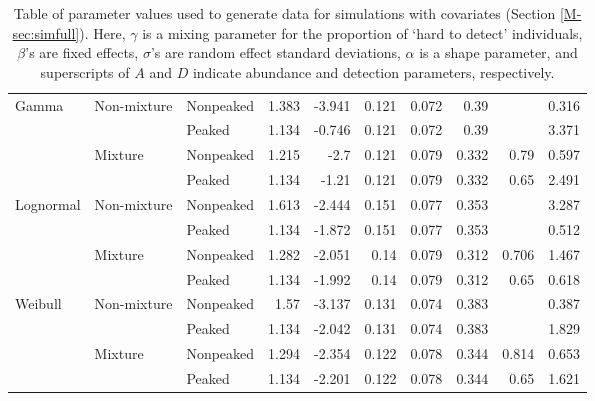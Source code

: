 \documentclass[useAMS,usenatbib,referee,12pt]{article}
\begin{document}
\begin{table}
\begin{tabular}{ll|lrrrrrrr}
Gamma & Non-mixture & Nonpeaked &1.383&-3.941&0.121&0.072&0.39& & 0.316 \\
& & Peaked &1.134&-0.746&0.121&0.072&0.39& & 3.371 \\
& Mixture & Nonpeaked &1.215&-2.7&0.121&0.079&0.332&0.79& 0.597 \\
& & Peaked &1.134&-1.21&0.121&0.079&0.332&0.65& 2.491 \\
Lognormal & Non-mixture & Nonpeaked &1.613&-2.444&0.151&0.077&0.353& & 3.287 \\
& & Peaked &1.134&-1.872&0.151&0.077&0.353& & 0.512 \\
& Mixture & Nonpeaked &1.282&-2.051&0.14&0.079&0.312&0.706& 1.467 \\
& & Peaked &1.134&-1.992&0.14&0.079&0.312&0.65& 0.618 \\
Weibull & Non-mixture & Nonpeaked &1.57&-3.137&0.131&0.074&0.383& & 0.387 \\
& & Peaked &1.134&-2.042&0.131&0.074&0.383& & 1.829 \\
& Mixture & Nonpeaked &1.294&-2.354&0.122&0.078&0.344&0.814& 0.653 \\
& & Peaked &1.134&-2.201&0.122&0.078&0.344&0.65& 1.621 \\
   \hline
\end{tabular}
\caption{\label{tbl:sim3}Table of parameter values used to generate data for simulations with covariates (Section \ref{M-sec:simfull}).  Here, $\gamma$ is a mixing parameter for the proportion of `hard to detect' individuals, $\beta$'s are fixed effects, $\sigma$'s are random effect standard deviations, $\alpha$ is a shape parameter, and superscripts of $A$ and $D$ indicate abundance and detection parameters, respectively.}
\end{table}
\end{document}
